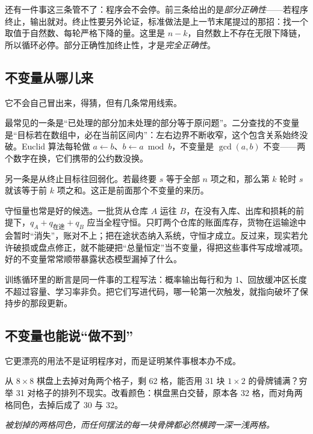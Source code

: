 还有一件事这三条管不了：程序会不会停。前三条给出的是\emph{部分正确性}——若程序终止，输出就对。终止性要另外论证，标准做法是上一节末尾提过的那招：找一个取值于自然数、每轮严格下降的量。这里是 \(n-k\)，自然数上不存在无限下降链，所以循环必停。部分正确性加终止性，才是\emph{完全正确性}。

\subsection{不变量从哪儿来}

它不会自己冒出来，得猜，但有几条常用线索。

最常见的一条是``已处理的部分加未处理的部分等于原问题''。二分查找的不变量是``目标若在数组中，必在当前区间内''：左右边界不断收窄，这个包含关系始终没破。Euclid 算法每轮做 \(a\leftarrow b\)、\(b\leftarrow a\bmod b\)，不变量是 \(\gcd(a,b)\) 不变——两个数字在换，它们携带的公约数没换。

另一条是从终止目标往回弱化。若最终要 \(s\) 等于全部 \(n\) 项之和，那么第 \(k\) 轮时 \(s\) 就该等于前 \(k\) 项之和。这正是前面那个不变量的来历。

守恒量也常是好的候选。一批货从仓库 \(A\) 运往 \(B\)，在没有入库、出库和损耗的前提下，\(q_A+q_{\text{在途}}+q_B\) 应当全程守恒。只盯两个仓库的账面库存，货物在运输途中会暂时``消失''，账对不上；把在途状态纳入系统，守恒才成立。反过来，现实若允许破损或盘点修正，就不能硬把``总量恒定''当不变量，得把这些事件写成增减项。好的不变量常常顺带暴露状态模型漏掉了什么。

训练循环里的断言是同一件事的工程写法：概率输出每行和为 1、回放缓冲区长度不超过容量、学习率非负。把它们写进代码，哪一轮第一次触发，就指向破坏了保持步的那段更新。

\subsection{不变量也能说``做不到''}

它更漂亮的用法不是证明程序对，而是证明某件事根本办不成。

从 \(8\times8\) 棋盘上去掉对角两个格子，剩 62 格，能否用 31 块 \(1\times2\) 的骨牌铺满？穷举 31 对格子的排列不现实。改看颜色：棋盘黑白交替，原本各 32 格，而对角两格同色，去掉后成了 30 与 32。

\begin{center}

\emph{被划掉的两格同色，而任何摆法的每一块骨牌都必然横跨一深一浅两格。}
\end{center}

